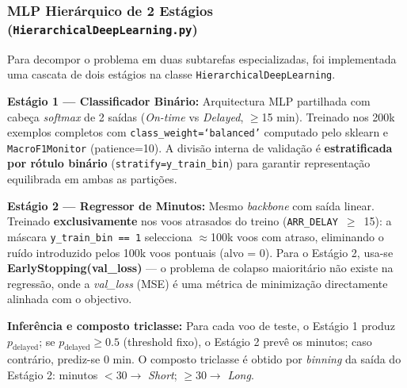 \documentclass[conference]{IEEEtran}
\begin{document}
\subsubsection{MLP Hierárquico de 2 Estágios (\texttt{HierarchicalDeepLearning.py})}
Para decompor o problema em duas subtarefas especializadas, foi implementada
uma cascata de dois estágios na classe \texttt{HierarchicalDeepLearning}.

\noindent\textbf{Estágio 1 — Classificador Binário:} Arquitectura MLP partilhada
com cabeça \textit{softmax} de 2 saídas (\textit{On-time} vs \textit{Delayed},
$\geq$15 min). Treinado nos 200k exemplos completos com
\texttt{class\_weight=`balanced'} computado pelo sklearn e \texttt{MacroF1Monitor}
(patience=10). A divisão interna de validação é \textbf{estratificada por
rótulo binário} (\texttt{stratify=y\_train\_bin}) para garantir representação
equilibrada em ambas as partições.

\noindent\textbf{Estágio 2 — Regressor de Minutos:} Mesmo \textit{backbone}
com saída linear. Treinado \textbf{exclusivamente} nos voos atrasados do treino
(\texttt{ARR\_DELAY}~$\geq$~15): a máscara \texttt{y\_train\_bin == 1} selecciona
$\approx$100k voos com atraso, eliminando o ruído introduzido pelos 100k voos
pontuais (alvo = 0). Para o Estágio 2, usa-se \textbf{EarlyStopping(val\_loss)}
— o problema de colapso maioritário não existe na regressão, onde a
\textit{val\_loss} (MSE) é uma métrica de minimização directamente alinhada com
o objectivo.

\noindent\textbf{Inferência e composto triclasse:} Para cada voo de teste, o
Estágio 1 produz $p_{\text{delayed}}$; se $p_{\text{delayed}} \geq 0.5$
(threshold fixo), o Estágio 2 prevê os minutos; caso contrário, prediz-se
0 min. O composto triclasse é obtido por \textit{binning} da saída do
Estágio 2: minutos $< 30 \to $ \textit{Short}; $\geq 30 \to $ \textit{Long}.
\end{document}
